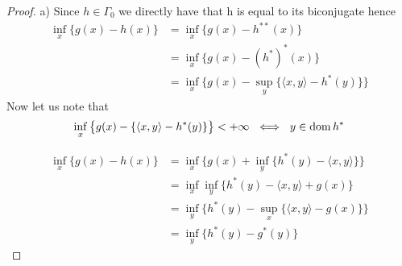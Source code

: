 \begin{proof}
	a) Since $h\in \Gamma_0$ we directly have that h is equal to its
	biconjugate hence
\begin{align*}
	\inf_x\{g(x) - h(x)\}
		&= \inf_x\{g(x) - h^{**}(x)\}\\
		&= \inf_x\{g(x) - (h^*)^*(x)\}\\
		&= \inf_x\big\{g(x) - \sup_y\{ \langle x,y \rangle - h^*(y)\}\big\}
\end{align*}
Now let us note that 
\begin{equation}
	\inf_x\big\{g(x) - \{ \langle x,y \rangle - h^*(y)\}\big\} < +\infty\
	\iff \ y \in \mathrm{dom} \, h^*
\end{equation}

\begin{align*}
		\inf_x\{g(x) - h(x)\}	&= \inf_x\big\{g(x) + \inf_y\{
			h^*(y) - \langle x,y \rangle \} \big\}\\
		&= \inf_x \inf_y \big\{ h^*(y) - \langle x,y \rangle +
		g(x)\big\}\\
		&= \inf_y \big\{ h^*(y) - \sup_x\{\langle x,y\rangle
			-g(x)\}\big\}\\
		&= \inf_y \{h^*(y) - g^*(y)\}
\end{align*}


\end{proof}
